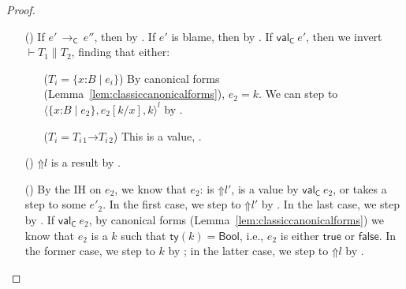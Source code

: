 \documentclass[9pt]{extarticle}
\newcommand{\ottnt}[1]{\mathit{#1}}
\newcommand{\ottmv}[1]{\mathit{#1}}
\newcommand{\ottsym}[1]{#1}
\begin{document}
\begin{lemma}
\begin{proof}
{\begin{itemize}
    \item[(\T{Cast})] If $\ottnt{e'} \,  \longrightarrow _{  \mathsf{C}  }  \, \ottnt{e''}$, then by . If
      $\ottnt{e'}$ is blame, then by . If $ \mathsf{val} _{  \mathsf{C}  }~ \ottnt{e'} $,
      then we invert $\vdash  \ottnt{T_{{\mathrm{1}}}}  \mathrel{\parallel}  \ottnt{T_{{\mathrm{2}}}}$, finding that either:
\begin{itemize}
      \item[($\ottnt{T_{\ottmv{i}}}  \ottsym{=}   \{ \mathit{x} \mathord{:} \ottnt{B} \mathrel{\mid} \ottnt{e_{\ottmv{i}}} \} $)] By canonical forms
        (Lemma~\ref{lem:classiccanonicalforms}), $\ottnt{e_{{\mathrm{2}}}}  \ottsym{=}  \ottnt{k}$. We can step to
        $ \langle   \{ \mathit{x} \mathord{:} \ottnt{B} \mathrel{\mid} \ottnt{e_{{\mathrm{2}}}} \}  ,   \ottnt{e_{{\mathrm{2}}}}  [  \ottnt{k} / \mathit{x}  ]  ,  \ottnt{k}  \rangle^{ \ottnt{l} } $ by \ECheckNone.

      \item[($\ottnt{T_{\ottmv{i}}}  \ottsym{=}   \ottnt{T_{\ottmv{i}\,{\mathrm{1}}}} \mathord{ \rightarrow } \ottnt{T_{\ottmv{i}\,{\mathrm{2}}}} $)] This is a value, .
      \end{itemize}

    \item[(\T{Blame})] $ \mathord{\Uparrow}  \ottnt{l} $ is a result by .

    \item[(\T{Check})] By the IH on $\ottnt{e_{{\mathrm{2}}}}$, we know that $\ottnt{e_{{\mathrm{2}}}}$:
      is $ \mathord{\Uparrow}  \ottnt{l'} $, is a value by $ \mathsf{val} _{  \mathsf{C}  }~ \ottnt{e_{{\mathrm{2}}}} $, or takes a
      step to some $\ottnt{e'_{{\mathrm{2}}}}$. In the first case, we step to
      $ \mathord{\Uparrow}  \ottnt{l'} $ by . In the last case, we step by
      . If $ \mathsf{val} _{  \mathsf{C}  }~ \ottnt{e_{{\mathrm{2}}}} $, by canonical forms
      (Lemma~\ref{lem:classiccanonicalforms}) we know that $\ottnt{e_{{\mathrm{2}}}}$ is a
      $\ottnt{k}$ such that $ \mathsf{ty} ( \ottnt{k} )   \ottsym{=}   \mathsf{Bool} $, i.e., $\ottnt{e_{{\mathrm{2}}}}$ is either
      $ \mathsf{true} $ or $ \mathsf{false} $. In the former case, we step to
      $\ottnt{k}$ by ; in the latter case, we step to
      $ \mathord{\Uparrow}  \ottnt{l} $ by .

    \end{itemize}    
    \fi}
  \end{proof}
\end{lemma}
\end{document}
